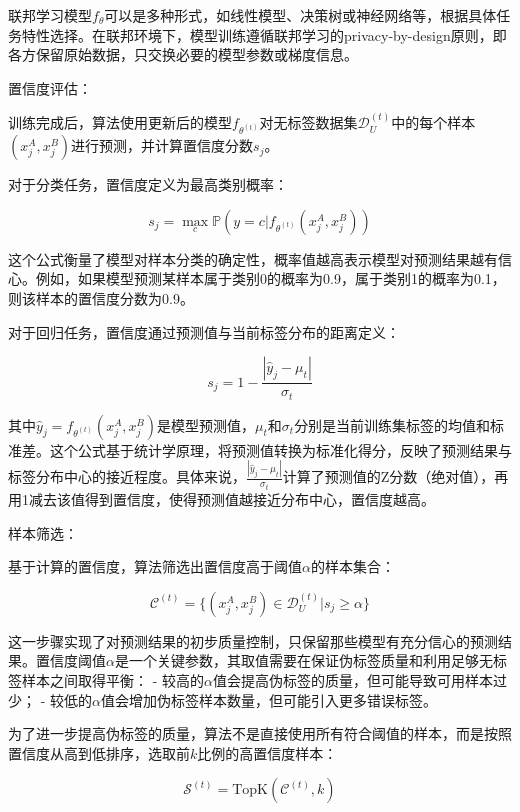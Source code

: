 联邦学习模型$f_\theta$可以是多种形式，如线性模型、决策树或神经网络等，根据具体任务特性选择。在联邦环境下，模型训练遵循联邦学习的privacy-by-design原则，即各方保留原始数据，只交换必要的模型参数或梯度信息。

置信度评估：

训练完成后，算法使用更新后的模型$f_{\theta^{(t)}}$对无标签数据集$\mathcal{D}_U^{(t)}$中的每个样本$(x^A_j,x^B_j)$进行预测，并计算置信度分数$s_j$。

对于分类任务，置信度定义为最高类别概率：

\begin{equation}
	s_j = \max_{c} \mathbb{P}(y=c|f_{\theta^{(t)}}(x^A_j,x^B_j))
\end{equation}

这个公式衡量了模型对样本分类的确定性，概率值越高表示模型对预测结果越有信心。例如，如果模型预测某样本属于类别0的概率为0.9，属于类别1的概率为0.1，则该样本的置信度分数为0.9。

对于回归任务，置信度通过预测值与当前标签分布的距离定义：

\begin{equation}
	s_j = 1 - \frac{|\hat{y}_j - \mu_t|}{\sigma_t}
\end{equation}

其中$\hat{y}_j = f_{\theta^{(t)}}(x^A_j,x^B_j)$是模型预测值，$\mu_t$和$\sigma_t$分别是当前训练集标签的均值和标准差。这个公式基于统计学原理，将预测值转换为标准化得分，反映了预测结果与标签分布中心的接近程度。具体来说，$\frac{|\hat{y}_j - \mu_t|}{\sigma_t}$计算了预测值的Z分数（绝对值），再用1减去该值得到置信度，使得预测值越接近分布中心，置信度越高。

样本筛选：

基于计算的置信度，算法筛选出置信度高于阈值$\alpha$的样本集合：

\begin{equation}
	\mathcal{C}^{(t)} = \{(x^A_j,x^B_j) \in \mathcal{D}_U^{(t)} | s_j \geq \alpha\}
\end{equation}

这一步骤实现了对预测结果的初步质量控制，只保留那些模型有充分信心的预测结果。置信度阈值$\alpha$是一个关键参数，其取值需要在保证伪标签质量和利用足够无标签样本之间取得平衡：
- 较高的$\alpha$值会提高伪标签的质量，但可能导致可用样本过少；
- 较低的$\alpha$值会增加伪标签样本数量，但可能引入更多错误标签。

为了进一步提高伪标签的质量，算法不是直接使用所有符合阈值的样本，而是按照置信度从高到低排序，选取前$k$比例的高置信度样本：

\begin{equation}
	\mathcal{S}^{(t)} = \text{TopK}(\mathcal{C}^{(t)}, k)
\end{equation}

